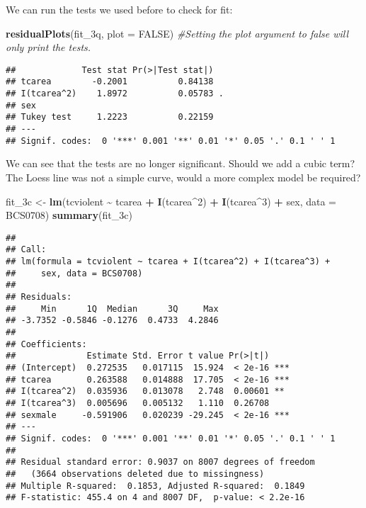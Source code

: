\documentclass[
]{book}
\newenvironment{Shaded}{\begin{snugshade}}{\end{snugshade}}
\newcommand{\AttributeTok}[1]{\textcolor[rgb]{0.13,0.29,0.53}{#1}}
\newcommand{\CommentTok}[1]{\textcolor[rgb]{0.56,0.35,0.01}{\textit{#1}}}
\newcommand{\ConstantTok}[1]{\textcolor[rgb]{0.56,0.35,0.01}{#1}}
\newcommand{\DecValTok}[1]{\textcolor[rgb]{0.00,0.00,0.81}{#1}}
\newcommand{\FunctionTok}[1]{\textcolor[rgb]{0.13,0.29,0.53}{\textbf{#1}}}
\newcommand{\NormalTok}[1]{#1}
\newcommand{\OtherTok}[1]{\textcolor[rgb]{0.56,0.35,0.01}{#1}}
\newcommand{\SpecialCharTok}[1]{\textcolor[rgb]{0.81,0.36,0.00}{\textbf{#1}}}
\begin{document}
We can run the tests we used before to check for fit:

\begin{Shaded}
\begin{Highlighting}[]
\FunctionTok{residualPlots}\NormalTok{(fit\_3q, }\AttributeTok{plot =} \ConstantTok{FALSE}\NormalTok{) }\CommentTok{\#Setting the plot argument to false will only print the tests.}
\end{Highlighting}
\end{Shaded}

\begin{verbatim}
##             Test stat Pr(>|Test stat|)  
## tcarea        -0.2001          0.84138  
## I(tcarea^2)    1.8972          0.05783 .
## sex                                     
## Tukey test     1.2223          0.22159  
## ---
## Signif. codes:  0 '***' 0.001 '**' 0.01 '*' 0.05 '.' 0.1 ' ' 1
\end{verbatim}

We can see that the tests are no longer significant. Should we add a cubic term? The Loess line was not a simple curve, would a more complex model be required?

\begin{Shaded}
\begin{Highlighting}[]
\NormalTok{fit\_3c }\OtherTok{\textless{}{-}} \FunctionTok{lm}\NormalTok{(tcviolent }\SpecialCharTok{\textasciitilde{}}\NormalTok{ tcarea }\SpecialCharTok{+} \FunctionTok{I}\NormalTok{(tcarea}\SpecialCharTok{\^{}}\DecValTok{2}\NormalTok{) }\SpecialCharTok{+} \FunctionTok{I}\NormalTok{(tcarea}\SpecialCharTok{\^{}}\DecValTok{3}\NormalTok{) }\SpecialCharTok{+}\NormalTok{ sex, }\AttributeTok{data =}\NormalTok{ BCS0708)}
\FunctionTok{summary}\NormalTok{(fit\_3c)}
\end{Highlighting}
\end{Shaded}

\begin{verbatim}
## 
## Call:
## lm(formula = tcviolent ~ tcarea + I(tcarea^2) + I(tcarea^3) + 
##     sex, data = BCS0708)
## 
## Residuals:
##     Min      1Q  Median      3Q     Max 
## -3.7352 -0.5846 -0.1276  0.4733  4.2846 
## 
## Coefficients:
##              Estimate Std. Error t value Pr(>|t|)    
## (Intercept)  0.272535   0.017115  15.924  < 2e-16 ***
## tcarea       0.263588   0.014888  17.705  < 2e-16 ***
## I(tcarea^2)  0.035936   0.013078   2.748  0.00601 ** 
## I(tcarea^3)  0.005696   0.005132   1.110  0.26708    
## sexmale     -0.591906   0.020239 -29.245  < 2e-16 ***
## ---
## Signif. codes:  0 '***' 0.001 '**' 0.01 '*' 0.05 '.' 0.1 ' ' 1
## 
## Residual standard error: 0.9037 on 8007 degrees of freedom
##   (3664 observations deleted due to missingness)
## Multiple R-squared:  0.1853, Adjusted R-squared:  0.1849 
## F-statistic: 455.4 on 4 and 8007 DF,  p-value: < 2.2e-16
\end{verbatim}
\end{document}
